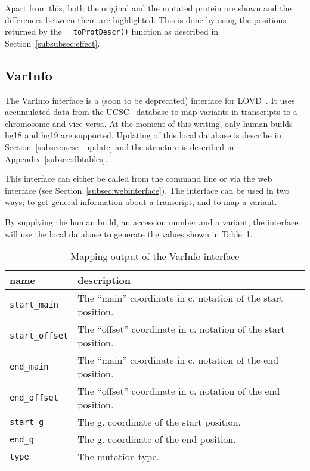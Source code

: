 \documentclass{article}
\begin{document}
Apart from this, both the original and the mutated protein are shown and the
differences between them are highlighted. This is done by using the positions
returned by the \texttt{\_\_toProtDescr()} function as described in
Section~\ref{subsubsec:effect}.

\subsection{VarInfo} \label{subsec:varinfo}
The VarInfo interface is a (soon to be deprecated) interface for
LOVD~\cite{LOVDD}. It uses accumulated data from the UCSC~\cite{UCSC} database
to map variants in transcripts to a chromosome and vice versa. At the moment of
this writing, only human builds hg18 and hg19 are supported. Updating of this
local database is describe in Section~\ref{subsec:ucsc_update} and the
structure is described in Appendix~\ref{subsec:dbtables}.

This interface can either be called from the command line or via the web
interface (see Section~\ref{subsec:webinterface}). The interface can be used
in two ways; to get general information about a transcript, and to map a
variant.

By supplying the human build, an accession number and a variant, the interface
will use the local database to generate the values shown in
Table~\ref{tab:varinfomap}.

\begin{table}[H]
\begin{tabular}{l|p{9cm}}
name                   & description\\
\hline
\texttt{start\_main}   & The ``main'' coordinate in c. notation of the start
                         position.\\
\texttt{start\_offset} & The ``offset'' coordinate in c. notation of the start
                         position.\\
\texttt{end\_main}     & The ``main'' coordinate in c. notation of the end
                         position.\\
\texttt{end\_offset}   & The ``offset'' coordinate in c. notation of the end
                         position.\\
\texttt{start\_g}      & The g. coordinate of the start position.\\
\texttt{end\_g}        & The g. coordinate of the end position.\\
\texttt{type}          & The mutation type.\\
\end{tabular}
\caption{Mapping output of the VarInfo interface} \label{tab:varinfomap}
\end{table}
\end{document}
